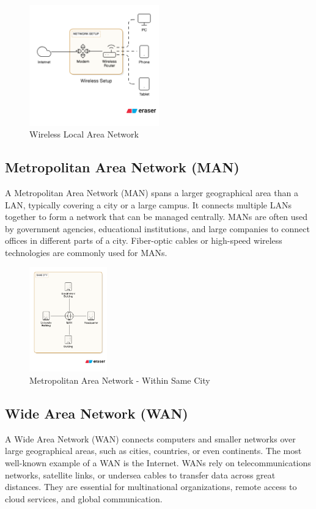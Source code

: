 \begin{figure}[H]
    \centering
    \includegraphics[width=0.5\textwidth]{images/chapter2/wlan.png}
    \caption{Wireless Local Area Network}
    \label{fig:wlan}
\end{figure}


\subsection{Metropolitan Area Network (MAN)}
A Metropolitan Area Network (MAN) spans a larger geographical area than a LAN, typically covering a city or a large campus. It connects multiple LANs together to form a network that can be managed centrally. MANs are often used by government agencies, educational institutions, and large companies to connect offices in different parts of a city. Fiber-optic cables or high-speed wireless technologies are commonly used for MANs.

\begin{figure}[H]
    \centering
    \includegraphics[width=0.3\textwidth]{images/chapter2/man.png}
    \caption{Metropolitan Area Network - Within Same City}
    \label{fig:man}
\end{figure}

\subsection{Wide Area Network (WAN)}
A Wide Area Network (WAN) connects computers and smaller networks over large geographical areas, such as cities, countries, or even continents. The most well-known example of a WAN is the Internet. WANs rely on telecommunications networks, satellite links, or undersea cables to transfer data across great distances. They are essential for multinational organizations, remote access to cloud services, and global communication.

